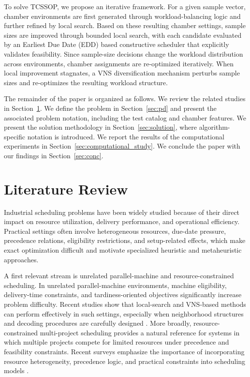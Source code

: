 \documentclass[11pt]{article}
\begin{document}
To solve TCSSOP, we propose an iterative framework. For a given sample vector, chamber environments are first generated through workload-balancing logic and further refined by local search. Based on these resulting chamber settings, sample sizes are improved through bounded local search, with each candidate evaluated by an Earliest Due Date (EDD) based constructive scheduler that explicitly validates feasibility. Since sample-size decisions change the workload distribution across environments, chamber assignments are re-optimized iteratively. When local improvement stagnates, a VNS diversification mechanism perturbs sample sizes and re-optimizes the resulting workload structure.

The remainder of the paper is organized as follows. We review the related studies in Section~\ref{sec:literature_review}. We define the problem in Section~\ref{sec:pd} and present the associated problem notation, including the test catalog and chamber features. We present the solution methodology in Section~\ref{sec:solution}, where algorithm-specific notation is introduced. We report the results of the computational experiments in Section~\ref{sec:computational_study}. We conclude the paper with our findings in Section~\ref{sec:conc}.
\section{Literature Review}
\label{sec:literature_review}

Industrial scheduling problems have been widely studied because of their direct impact on resource utilization, delivery performance, and operational efficiency. Practical settings often involve heterogeneous resources, due-date pressure, precedence relations, eligibility restrictions, and setup-related effects, which make exact optimization difficult and motivate specialized heuristic and metaheuristic approaches.

A first relevant stream is unrelated parallel-machine and resource-constrained scheduling. In unrelated parallel-machine environments, machine eligibility, delivery-time constraints, and tardiness-oriented objectives significantly increase problem difficulty. Recent studies show that local-search and VNS-based methods can perform effectively in such settings, especially when neighborhood structures and decoding procedures are carefully designed \citep{UlagaDurasevicJakobovic2022,MaeckerShenMonch2023}. More broadly, resource-constrained multi-project scheduling provides a natural reference for systems in which multiple projects compete for limited resources under precedence and feasibility constraints. Recent surveys emphasize the importance of incorporating resource heterogeneity, precedence logic, and practical constraints into scheduling models \citep{HartmannBriskorn2022,GomezSanchezLallaRuizFernandezGilCastroVoss2023}.
\end{document}

